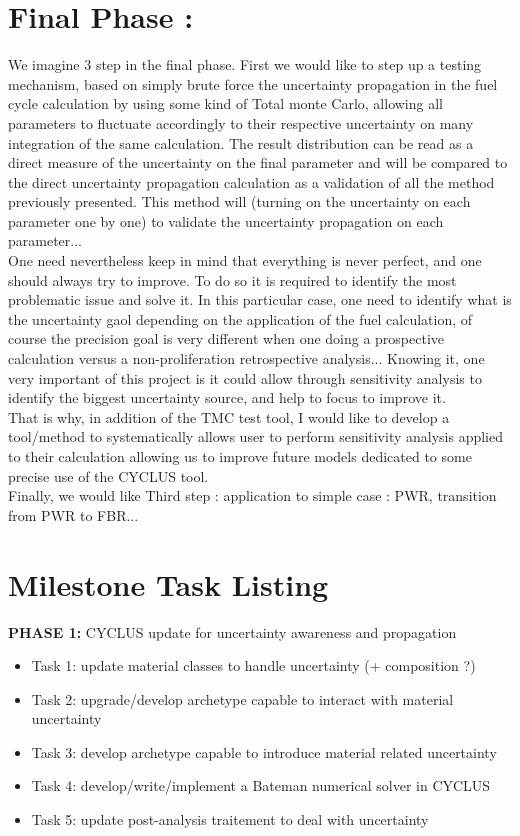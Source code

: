 \documentclass[dvips,12pt]{article}
\begin{document}
\section{Final Phase :}
We imagine 3 step in the final phase. First we would like to step up a testing mechanism, based on simply brute force the uncertainty propagation in the fuel cycle calculation by using some kind of Total monte Carlo, allowing all parameters to fluctuate accordingly to their respective uncertainty on many integration of the same calculation. The result distribution can be read as a direct measure of the uncertainty on the final parameter and will be compared to the direct uncertainty propagation calculation as a validation of all the method previously presented. This method will (turning on the uncertainty on each parameter one by one) to validate the uncertainty propagation on each parameter...\\
One need nevertheless keep in mind that everything is never perfect, and one should always try to improve. To do so it is required to identify the most problematic issue and solve it. In this particular case, one need to identify what is the uncertainty gaol depending on the application of the fuel calculation, of course the precision goal is very different when one doing a prospective calculation versus a non-proliferation retrospective analysis... Knowing it, one very important of this project is it could allow through sensitivity analysis to identify the biggest uncertainty source, and help to focus to improve it.\\
That is why, in addition of the TMC test tool, I would like to develop a tool/method to systematically allows user to perform sensitivity analysis applied to their calculation allowing us to improve future models dedicated to some precise use of the CYCLUS tool.\\


Finally, we would like
Third step : application to simple case : PWR, transition from PWR to FBR...

\pagebreak
\section{Milestone Task Listing}

\noindent\textbf{PHASE 1:} CYCLUS update for uncertainty awareness and propagation

\begin{itemize}
\item Task 1: update material classes to handle uncertainty (+ composition ?)
\item Task 2: upgrade/develop archetype capable to interact with material uncertainty
\item Task 3: develop archetype capable to introduce material related uncertainty
\item Task 4: develop/write/implement a Bateman numerical solver in CYCLUS
\item Task 5: update post-analysis traitement to deal with uncertainty  
\end{itemize}
 
\end{document}
